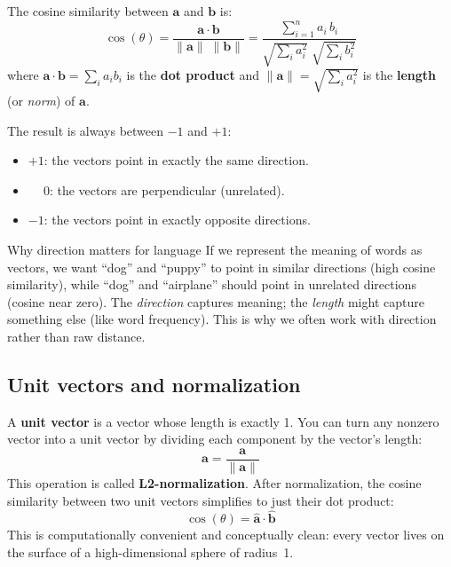 \documentclass[11pt,a4paper]{article}
\theoremstyle{definition}
\begin{document}
\begin{mathbox}
The cosine similarity between $\mathbf{a}$ and $\mathbf{b}$ is:
\[
\cos(\theta) = \frac{\mathbf{a} \cdot \mathbf{b}}
                     {\|\mathbf{a}\| \;\|\mathbf{b}\|}
= \frac{\sum_{i=1}^n a_i \, b_i}
       {\sqrt{\sum_i a_i^2}\;\sqrt{\sum_i b_i^2}}
\]
where $\mathbf{a} \cdot \mathbf{b} = \sum_i a_i b_i$ is the
\textbf{dot product} and $\|\mathbf{a}\| = \sqrt{\sum_i a_i^2}$ is
the \textbf{length} (or \emph{norm}) of $\mathbf{a}$.
\end{mathbox}

The result is always between $-1$ and $+1$:
\begin{itemize}[nosep]
  \item $+1$: the vectors point in exactly the same direction.
  \item $\phantom{+}0$: the vectors are perpendicular (unrelated).
  \item $-1$: the vectors point in exactly opposite directions.
\end{itemize}

\begin{intuition}{Why direction matters for language}
If we represent the meaning of words as vectors, we want ``dog'' and
``puppy'' to point in similar directions (high cosine similarity),
while ``dog'' and ``airplane'' should point in unrelated directions
(cosine near zero). The \emph{direction} captures meaning; the
\emph{length} might capture something else (like word frequency). This
is why we often work with direction rather than raw distance.
\end{intuition}

\subsection{Unit vectors and normalization}

A \textbf{unit vector} is a vector whose length is exactly 1. You can
turn any nonzero vector into a unit vector by dividing each component
by the vector's length:
\[
\hat{\mathbf{a}} = \frac{\mathbf{a}}{\|\mathbf{a}\|}
\]
This operation is called \textbf{L2-normalization}. After
normalization, the cosine similarity between two unit vectors simplifies
to just their dot product:
\[
\cos(\theta) = \hat{\mathbf{a}} \cdot \hat{\mathbf{b}}
\]
This is computationally convenient and conceptually clean: every vector
lives on the surface of a high-dimensional sphere of radius~1.

\end{document}
